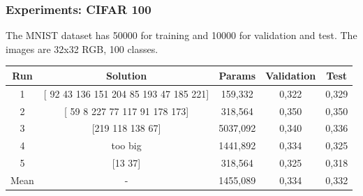 \documentclass[aspectratio=169]{beamer}
\begin{document}
		\begin{frame}
			\frametitle{Experiments: CIFAR 100}
			
			The MNIST dataset has 50000 for training and 10000 for validation and test. The images are 32x32 RGB, 100 classes.
		
			\begin{table}
				\begin{tabular}{c|c|c|c|c}
					\hline
					Run  &                 Solution                  &  Params  & Validation & Test  \\ \hline
					 1   & [ 92  43 136 151 204  85 193  47 185 221] & 159,332  &   0,322    & 0,329 \\
					 2   &     [ 59   8 227  77 117  91 178 173]     & 318,564  &   0,350    & 0,350 \\
					 3   &             [219 118 138  67]             & 5037,092 &   0,340    & 0,336 \\
					 4   &                  too big                  & 1441,892 &   0,334    & 0,325 \\
					 5   &                  [13 37]                  & 318,564  &   0,325    & 0,318 \\
					Mean &                     -                     & 1455,089 &   0,334    & 0,332 \\ \hline
				\end{tabular}
			\end{table}
		
		\end{frame}
\end{document}
